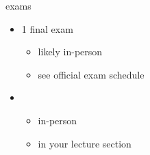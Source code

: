 \begin{frame}{exams}
    \begin{itemize}
    \item 1 final exam
        \begin{itemize}
        \item likely in-person
        \item see official exam schedule
        \end{itemize}
    \item {}
        \begin{itemize}
        \item in-person
        \item in your lecture section
        \end{itemize}
    \end{itemize}
\end{frame}

